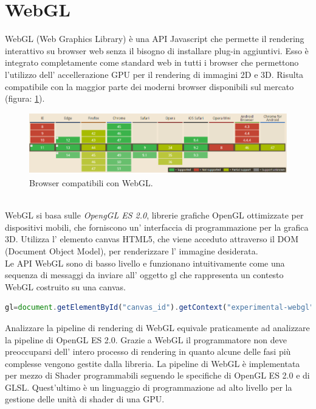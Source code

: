 \section{WebGL}
\label{sec:chapter_tecnologie_abilitanti_webgl}
WebGL (Web Graphics Library) è una API Javascript che permette il rendering interattivo su browser web senza il bisogno di installare plug-in aggiuntivi.
Esso è integrato completamente come standard web in tutti i browser che permettono l’utilizzo dell’ accellerazione GPU per il rendering di immagini 2D e 3D.
Risulta compatibile con la maggior parte dei moderni browser disponibili sul mercato (figura: \ref{fig:stato_arte_webgl_compat}).
\\
\begin{figure}[htb]
 \centering
 \includegraphics[width=1\linewidth]{images/chapter_tecnologie_abilitanti/tecnologie_abilitanti_webgl_compat.png}\hfill
 \caption[Lista browser compatibili]{Browser compatibili con WebGL.}
 \label{fig:stato_arte_webgl_compat}
\end{figure}
\\
WebGL si basa sulle \emph{OpengGL ES 2.0}, librerie grafiche OpenGL ottimizzate per dispositivi mobili, che forniscono un’ interfaccia di programmazione per la grafica 3D. Utilizza l’ elemento canvas HTML5, che viene acceduto attraverso il DOM (Document Object Model), per renderizzare l’ immagine desiderata.
\\
Le API WebGL sono di basso livello e funzionano intuitivamente come una sequenza di messaggi da inviare all’ oggetto gl che rappresenta un contesto WebGL costruito su una canvas.
\begin{lstlisting}[language=JavaScript]
gl=document.getElementById("canvas_id").getContext("experimental-webgl");
\end{lstlisting}
Analizzare la pipeline di rendering di WebGL equivale praticamente ad analizzare la pipeline di OpenGL ES 2.0. Grazie a WebGL il programmatore non deve preoccuparsi dell’ intero processo di rendering in quanto alcune delle fasi più complesse vengono gestite dalla libreria.
La pipeline di WebGL è implementata per mezzo di Shader programmabili seguendo le specifiche di OpenGL ES 2.0 e di GLSL. Quest’ultimo è un linguaggio di programmazione ad alto livello per la gestione delle unità di shader di una GPU.
